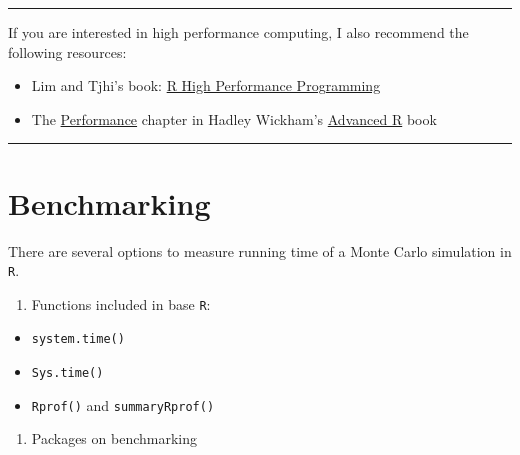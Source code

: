 \documentclass[
]{book}
\newenvironment{Shaded}{\begin{snugshade}}{\end{snugshade}}
\newcommand{\CommentTok}[1]{\textcolor[rgb]{0.56,0.35,0.01}{\textit{#1}}}
\newcommand{\KeywordTok}[1]{\textcolor[rgb]{0.13,0.29,0.53}{\textbf{#1}}}
\newcommand{\NormalTok}[1]{#1}
\providecommand{\tightlist}{%
  \setlength{\itemsep}{0pt}\setlength{\parskip}{0pt}}
\begin{document}
\begin{Shaded}
\begin{Highlighting}[]
{{{{{{{{{\CommentTok{# Stop the clusters}
\KeywordTok{stopCluster}\NormalTok{(cl)}
\end{Highlighting}
\end{Shaded}

\begin{center}\rule{0.5\linewidth}{\linethickness}\end{center}

If you are interested in high performance computing, I also recommend the following resources:

\begin{itemize}
\tightlist
\item
  Lim and Tjhi's book: \href{https://www.packtpub.com/application-development/r-high-performance-programming}{R High Performance Programming}
\item
  The \href{http://adv-r.had.co.nz/Performance.html}{Performance} chapter in Hadley Wickham's \href{http://adv-r.had.co.nz/}{Advanced R} book
\end{itemize}

\begin{center}\rule{0.5\linewidth}{\linethickness}\end{center}

\hypertarget{benchmarking}{%
\section{Benchmarking}\label{benchmarking}}

There are several options to measure running time of a Monte Carlo simulation in \texttt{R}.

\begin{enumerate}
\def\labelenumi{\arabic{enumi}.}
\tightlist
\item
  Functions included in base \texttt{R}:
\end{enumerate}

\begin{itemize}
\tightlist
\item
  \texttt{system.time()}
\item
  \texttt{Sys.time()}
\item
  \texttt{Rprof()} and \texttt{summaryRprof()}
\end{itemize}

\begin{enumerate}
\def\labelenumi{\arabic{enumi}.}
\setcounter{enumi}{1}
\tightlist
\item
  Packages on benchmarking
\end{enumerate}
\end{document}
